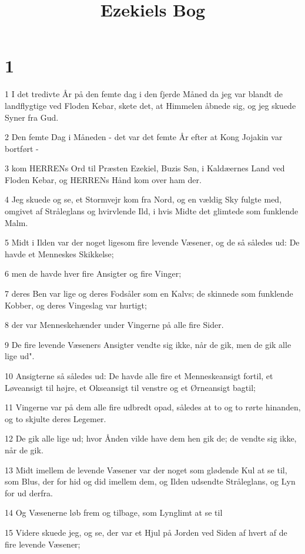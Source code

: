 

\title{Ezekiels Bog}


\chapter{1}

\par 1 I det tredivte År på den femte dag i den fjerde Måned da jeg var blandt de landflygtige ved Floden Kebar, skete det, at Himmelen åbnede sig, og jeg skuede Syner fra Gud.
\par 2 Den femte Dag i Måneden - det var det femte År efter at Kong Jojakin var bortført -
\par 3 kom HERRENs Ord til Præsten Ezekiel, Buzis Søn, i Kaldæernes Land ved Floden Kebar, og HERRENs Hånd kom over ham der.
\par 4 Jeg skuede og se, et Stormvejr kom fra Nord, og en vældig Sky fulgte med, omgivet af Stråleglans og hvirvlende Ild, i hvis Midte det glimtede som funklende Malm.
\par 5 Midt i Ilden var der noget ligesom fire levende Væsener, og de så således ud: De havde et Menneskes Skikkelse;
\par 6 men de havde hver fire Ansigter og fire Vinger;
\par 7 deres Ben var lige og deres Fodsåler som en Kalvs; de skinnede som funklende Kobber, og deres Vingeslag var hurtigt;
\par 8 der var Menneskehænder under Vingerne på alle fire Sider.
\par 9 De fire levende Væseners Ansigter vendte sig ikke, når de gik, men de gik alle lige ud".
\par 10 Ansigterne så således ud: De havde alle fire et Menneskeansigt fortil, et Løveansigt til højre, et Okseansigt til venstre og et Ørneansigt bagtil;
\par 11 Vingerne var på dem alle fire udbredt opad, således at to og to rørte hinanden, og to skjulte deres Legemer.
\par 12 De gik alle lige ud; hvor Ånden vilde have dem hen gik de; de vendte sig ikke, når de gik.
\par 13 Midt imellem de levende Væsener var der noget som glødende Kul at se til, som Blus, der for hid og did imellem dem, og Ilden udsendte Stråleglans, og Lyn for ud derfra.
\par 14 Og Væsenerne løb frem og tilbage, som Lynglimt at se til
\par 15 Videre skuede jeg, og se, der var et Hjul på Jorden ved Siden af hvert af de fire levende Væsener;
